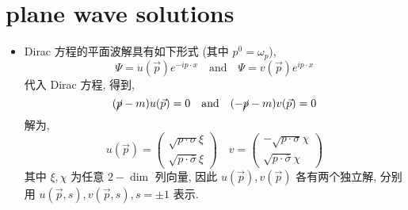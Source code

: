 \section{plane wave solutions}
\begin{itemize}
	\item Dirac 方程的平面波解具有如下形式 (其中 $p^0 = \omega_p$),
	\begin{equation}
		\Psi = u(\vec{p}) e^{- i p \cdot x} \quad \text{and} \quad \Psi = v(\vec{p}) e^{i p \cdot x}
	\end{equation}
	代入 Dirac 方程, 得到,
	\begin{equation}
		(\cancel{p} - m) u(\vec{p}) = 0 \quad \text{and} \quad (- \cancel{p} - m) v(\vec{p}) = 0
	\end{equation}
	解为,
	\begin{equation}
		u(\vec{p}) = \begin{pmatrix}
			\sqrt{p \cdot \sigma} \xi \\
			\sqrt{p \cdot \bar{\sigma}} \xi
		\end{pmatrix} \quad v = \begin{pmatrix}
			- \sqrt{p \cdot \sigma} \chi \\
			\sqrt{p \cdot \bar{\sigma}} \chi
		\end{pmatrix}
	\end{equation}
	其中 $\xi, \chi$ 为任意 $2-\dim$ 列向量, 因此 $u(\vec{p}), v(\vec{p})$ 各有两个独立解, 分别用 $u(\vec{p}, s), v(\vec{p}, s), s = \pm 1$ 表示.
	

\end{itemize}
